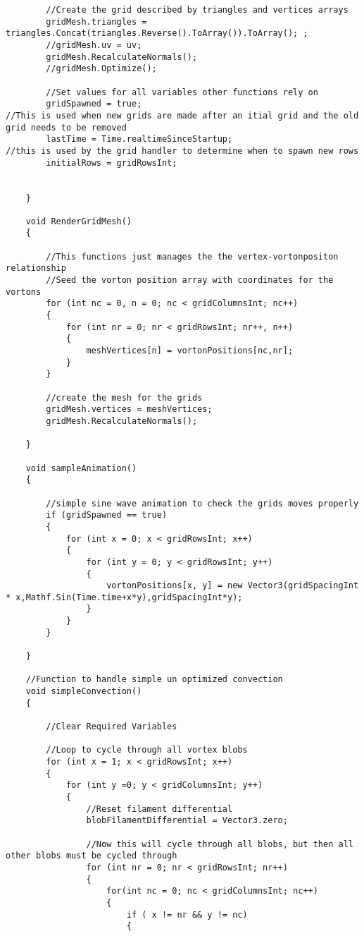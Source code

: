 \begin{mdframed}[linecolor=black, topline=true, bottomline=true,
  leftline=false, rightline=false]
\begin{verbatim}
        //Create the grid described by triangles and vertices arrays
        gridMesh.triangles = triangles.Concat(triangles.Reverse().ToArray()).ToArray(); ;
        //gridMesh.uv = uv;
        gridMesh.RecalculateNormals();
        //gridMesh.Optimize();

        //Set values for all variables other functions rely on
        gridSpawned = true;                                         //This is used when new grids are made after an itial grid and the old grid needs to be removed
        lastTime = Time.realtimeSinceStartup;                       //this is used by the grid handler to determine when to spawn new rows
        initialRows = gridRowsInt;
        

    }

    void RenderGridMesh()
    {

        //This functions just manages the the vertex-vortonpositon relationship
        //Seed the vorton position array with coordinates for the vortons
        for (int nc = 0, n = 0; nc < gridColumnsInt; nc++)
        {
            for (int nr = 0; nr < gridRowsInt; nr++, n++)
            {
                meshVertices[n] = vortonPositions[nc,nr];
            }
        }

        //create the mesh for the grids
        gridMesh.vertices = meshVertices;
        gridMesh.RecalculateNormals();

    }

    void sampleAnimation()
    {

        //simple sine wave animation to check the grids moves properly
        if (gridSpawned == true)
        {
            for (int x = 0; x < gridRowsInt; x++)
            {
                for (int y = 0; y < gridRowsInt; y++)
                {
                    vortonPositions[x, y] = new Vector3(gridSpacingInt * x,Mathf.Sin(Time.time+x*y),gridSpacingInt*y);
                }
            }
        }

    }

    //Function to handle simple un optimized convection
    void simpleConvection()
    {

        //Clear Required Variables

        //Loop to cycle through all vortex blobs
        for (int x = 1; x < gridRowsInt; x++)
        {
            for (int y =0; y < gridColumnsInt; y++)
            {
                //Reset filament differential
                blobFilamentDifferential = Vector3.zero;

                //Now this will cycle through all blobs, but then all other blobs must be cycled through
                for (int nr = 0; nr < gridRowsInt; nr++)
                {
                    for(int nc = 0; nc < gridColumnsInt; nc++)
                    {
                        if ( x != nr && y != nc)
                        {


\end{verbatim}
\end{mdframed}

